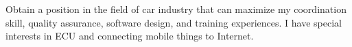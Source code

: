 Obtain a position in the field of car industry
that can maximize my coordination skill,
     quality assurance,
     software design,
     and training experiences.
     I have special interests in ECU and connecting mobile things to Internet.
